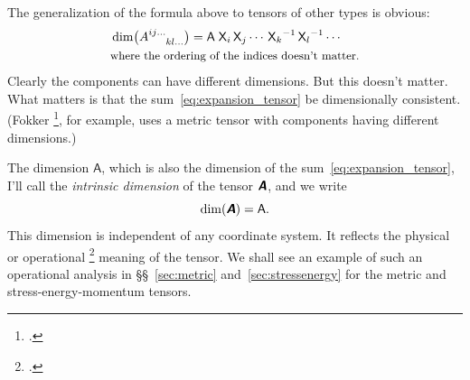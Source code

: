 \documentclass[\ifafour a4paper,12pt,\else a5paper,10pt,\fi%
onecolumn,oneside,article,%
british%
]{memoir}
\theoremstyle{remark}
\theoremstyle{innote}
\newcommand*{\mathte}[1]{\textbf{\textit{\textsf{#1}}}}
\newcommand*{\citep}{\footcites}
\renewcommand*{\|}[1][]{\nonscript\,#1\vert\nonscript\;\mathopen{}}
\newcommand*{\sect}{\S}%
\newcommand*{\sects}{\S\S}%
\newcommand*{\Un}{\textsf{1}}
\newcommand*{\Le}{\textsf{L}}
\newcommand*{\Ti}{\textsf{T}}
\newcommand*{\Ma}{\textsf{M}}
\newcommand*{\Te}{\Theta}
\newcommand*{\Xx}{\textsf{X}}
\newcommand*{\Aa}{\textsf{A}}
\newcommand*{\yA}{\mathte{A}}
\renewcommand*{\i}{\indices}
\begin{document}
The generalization of the formula above to tensors of other types is obvious:
\begin{equation}
  \label{eq:dim_component_generic}
  \begin{aligned}
&\dim\bigl(A\i{^{ij\dotso}_{kl\dotso}}\bigr) = \Aa\;{\Xx_{i}}\,{\Xx_{j}}\dotsm\,
  {\Xx_{k}}^{-1}\,{\Xx_{l}}^{-1}\dotsm \\
  &\text{\small where the ordering of the indices doesn't matter.}
  \end{aligned}
\end{equation}
Clearly the components can have different dimensions. But this doesn't matter.
What matters is that the sum~\eqref{eq:expansion_tensor} be dimensionally
consistent. (Fokker \citep[\sect~VII.1 p.~88]{fokker1960_t1965}, for
example, uses a metric tensor with components having different dimensions.)

\medskip

The dimension $\Aa$, which is also the dimension of the
sum~\eqref{eq:expansion_tensor}, I'll call the \emph{intrinsic dimension}
of the tensor $\yA$, and we write
\begin{equation}
  \label{eq:abs_dim}
  \dim(\yA) = \Aa.
\end{equation}
This dimension is independent of any coordinate system. It reflects the
physical or operational \citep{bridgman1927_r1958}[see
also][\sect~A.2]{synge1960}[\sects~A.3--4]{truesdelletal1960} meaning of
the tensor. We shall see an example of such an operational analysis in
\sects~\ref{sec:metric} and~\ref{sec:stressenergy} for the metric and
stress-energy-momentum tensors.
\end{document}
